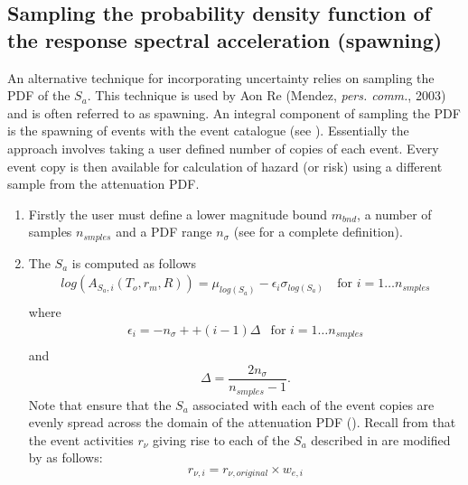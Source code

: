 \subsection{Sampling the probability density function of
the response spectral acceleration (spawning)} \label{attn:uncert-pdfchoice}


An alternative technique for incorporating uncertainty relies on
sampling the PDF of the $S_a$. This technique is used by Aon Re
(Mendez, \textit{pers. comm.}, 2003) and is often referred to as
spawning. An integral component of sampling the PDF is the spawning
of events with the event catalogue (see ).
Essentially the approach involves taking a user defined number of
copies of each event. Every event copy is then available for
calculation of hazard (or risk) using a different sample from the
attenuation PDF.
\begin{enumerate}
\item Firstly the user must define a lower magnitude bound
$m_{bnd}$, a number of samples $n_{smples}$ and a PDF range
$n_\sigma$ (see  for a complete definition).
\item The $S_a$ is computed as follows
\begin{equation}
\label{attn:uncertainty-pdfsample}
\begin{array}{ll}
log(A_{S_a,i}(T_o,r_m,R)) = \mu_{log(S_a)} - \epsilon_i
\sigma_{log(S_a)}\ & \textrm{for $i=1 \ldots
n_{smples}$} \\
\end{array}
\end{equation}
where
\begin{equation}
\label{attn:uncertainty-def-epsilon}
\begin{array}{ll}
\epsilon_i = -n_\sigma + + (i-1)\Delta &
\textrm{for $i=1 \ldots n_{smples}$} \\
\end{array}
\end{equation}
and
\begin{equation}
\Delta = \frac{2n_\sigma}{n_{smples}-1}.
\end{equation}
Note that
ensure that the $S_a$ associated with each of the event copies are
evenly spread across the domain of the attenuation PDF
(). Recall from 
that the event activities $r_\nu$ giving rise to each of the $S_a$
described in  are modified by
 as follows:
\begin{equation}
r_{\nu,i} = r_{\nu,original} \times w_{e,i}
\end{equation}
\end{enumerate}

